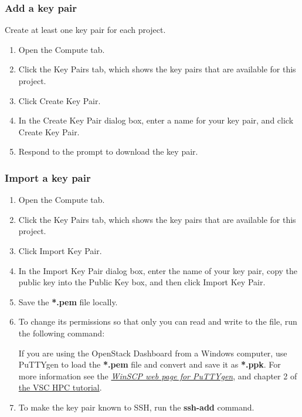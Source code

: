 \subsubsection{Add a key pair}\label{add-a-key-pair}
Create at least one key pair for each project.

\begin{enumerate}
\item Open the Compute tab.
\item Click the Key Pairs tab, which shows the key pairs that are
  available for this project.
\item Click Create Key Pair.
\item In the Create Key Pair dialog box, enter a name for your key
  pair, and click Create Key Pair.
\item Respond to the prompt to download the key pair.
  \end{enumerate}

\subsubsection{Import a key pair}\label{import-a-key-pair}

\begin{enumerate}
\item Open the Compute tab.
\item Click the Key Pairs tab, which shows the key pairs that are
  available for this project.
\item Click Import Key Pair.
\item In the Import Key Pair dialog box, enter the name of your key
  pair, copy the public key into the Public Key box, and then click
  Import Key Pair.
\item Save the \textbf{*.pem} file locally.
\item To change its permissions so that only you can read and write to
  the file, run the following command:

  \begin{prompt}
  \end{prompt}

   If you are using the \gls{OpenStack Dashboard} from a
  Windows computer, use PuTTYgen to load the \textbf{*.pem} file and
  convert and save it as \textbf{*.ppk}.  For more information see the
  \href{https://winscp.net/eng/docs/ui_puttygen}{\emph{WinSCP web page
      for PuTTYgen}}, and chapter 2 of
  \href{https://www.vscentrum.be/support/tut-book/vsc-tutorials}{the
    VSC HPC tutorial}.

\item To make the key pair known to SSH, run the \textbf{ssh-add}
  command.

  \begin{prompt}
  \end{prompt}
\end{enumerate}

